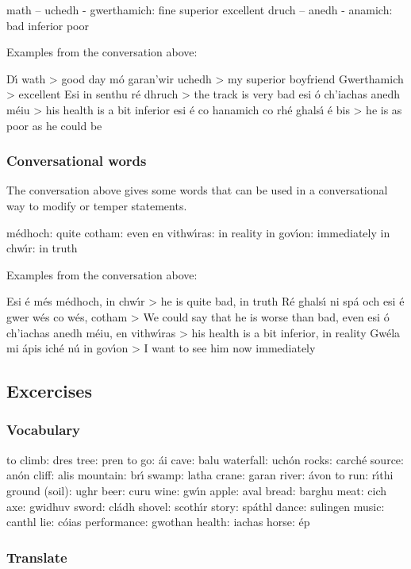         math –  uchedh   -  gwerthamich: fine       superior     excellent
        druch – anedh -    anamich: bad       inferior    poor

Examples from the conversation above:

D\'{\i} wath > good day
m\'{o} garan’wir uchedh > my superior boyfriend
Gwerthamich > excellent
Esi in senthu r\'{e} dhruch > the track is very bad
esi \'{o} ch’iachas anedh m\'{e}iu > his health is a bit inferior
esi \'{e} co hanamich co rh\'{e} ghals\'{\i} \'{e} bis > he is as poor as he could be

\subsubsection{Conversational words}

The conversation above gives some words that can be used in a conversational way to modify or temper statements.

m\'{e}dhoch: quite
cotham: even
en vithw\'{\i}ras: in reality
in gov\'{\i}on: immediately
in chw\'{\i}r: in truth

Examples from the conversation above:

Esi \'{e} m\'{e}s m\'{e}dhoch, in chw\'{\i}r > he is quite bad, in truth
R\'{e} ghals\'{\i} ni sp\'{a} och esi \'{e} gwer w\'{e}s co w\'{e}s, cotham > We could say that he is worse than bad, even
esi \'{o} ch’iachas anedh m\'{e}iu, en vithw\'{\i}ras > his health is a bit inferior, in reality
Gw\'{e}la mi \'{a}pis ich\'{e} n\'{u} in gov\'{\i}on > I want to see him now immediately

\subsection{Excercises}

\subsubsection{Vocabulary}

to climb: dres
tree: pren
to go: \'{a}i
cave: balu
waterfall: uch\'{o}n
rocks: carch\'{e}
source: an\'{o}n
cliff: alis
mountain: br\'{\i}
swamp: latha
crane: garan
river: \'{a}von
to run: r\'{\i}thi
ground (soil): ughr
beer: curu
wine: gw\'{\i}n
apple: aval
bread: barghu
meat: cich
axe: gwidhuv
sword: cl\'{a}dh
shovel: scoth\'{\i}r
story: sp\'{a}thl
dance: sulingen
music: canthl
lie: c\'{o}ias
performance: gwothan
health: iachas
horse: \'{e}p

\subsubsection{Translate}

